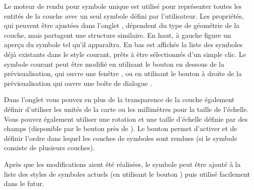 Le moteur de rendu pour symbole unique est utilisé pour représenter toutes les 
entités de la couche avec un seul symbole défini par l'utilisateur. Les propriétés, 
qui peuvent être ajustées dans l'onglet , dépendent du type de 
géométrie de la couche, mais partagent une structure similaire. En haut, à gauche 
figure un aperçu du symbole tel qu'il apparaîtra. En bas est affichée la liste 
des symboles déjà existants dans le style courant, prêts à être sélectionnés 
d'un simple clic. Le symbole courant peut être modifié en utilisant le bouton 
 en dessous de la prévisualisation, qui ouvre une fenêtre 
, ou en utilisant le bouton  
à droite de la prévisualisation qui ouvre une boîte de dialogue .

Dans l'onglet  vous pouvez en plus de la transparence de la couche 
également définir d'utiliser les unités de la carte ou les millimètres pour la 
taille de l'échelle. Vous pouvez également utiliser une rotation et une taille 
d'échelle définie par des champs (disponible par le bouton  près 
de ). Le bouton  permet 
d'activer et de définir l'ordre dans lequel les couches de symboles sont rendues 
(si le symbole consiste de plusieurs couches).

Après que les modifications aient été réalisées, le symbole peut être ajouté 
à la liste des styles de symboles actuels (en utilisant le bouton ) puis utilisé facilement dans le futur. 

